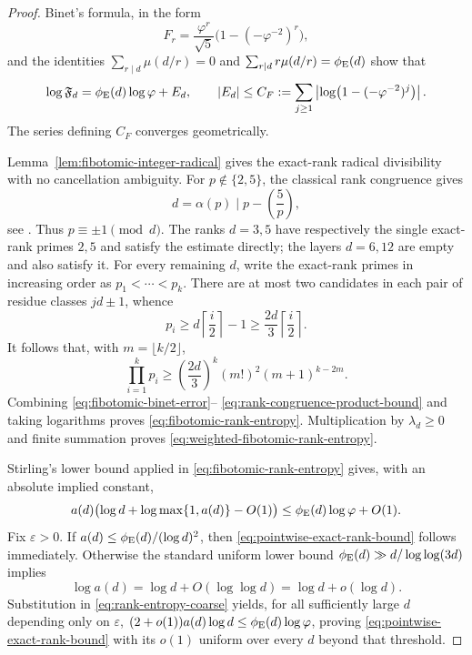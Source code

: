 \begin{proof}
Binet's formula, in the form
\[
 F_r=\frac{\varphi^r}{\sqrt5}
 \bigl(1-(-\varphi^{-2})^r\bigr),
\]
and the identities
$\sum_{r\mid d}\mu(d/r)=0$ and
$\sum_{r\mid d}r\mu(d/r)=\phi_{\rm E}(d)$ show that
\begin{equation}\label{eq:fibotomic-binet-error}
 \log\mathfrak F_d=\phi_{\rm E}(d)\log\varphi+E_d,
 \qquad
 |E_d|\leq
 C_F:=\sum_{j\geq1}
 \left|\log\bigl(1-(-\varphi^{-2})^j\bigr)\right|.
\end{equation}
The series defining $C_F$ converges geometrically.

Lemma~\ref{lem:fibotomic-integer-radical} gives the exact-rank radical
divisibility with no cancellation ambiguity.
For $p\notin\{2,5\}$, the classical rank congruence gives
\[
 d=\alpha(p)\mid p-\left(\frac5p\right),
\]
see \cite{Wall1960FibonacciModm,Vinson1963RankApparition}. Thus
$p\equiv\pm1\pmod d$. The ranks $d=3,5$ have respectively the single
exact-rank primes $2,5$ and satisfy the estimate directly; the layers
$d=6,12$ are empty and also satisfy it. For every remaining $d$, write the
exact-rank primes in increasing order as
$p_1<\cdots<p_k$. There are at most two candidates in each pair of residue
classes $jd\pm1$, whence
\[
 p_i\geq d\left\lceil\frac i2\right\rceil-1
 \geq\frac{2d}{3}\left\lceil\frac i2\right\rceil.
\]
It follows that, with $m=\lfloor k/2\rfloor$,
\begin{equation}\label{eq:rank-congruence-product-bound}
 \prod_{i=1}^kp_i\geq
 \left(\frac{2d}{3}\right)^k(m!)^2(m+1)^{k-2m}.
\end{equation}
Combining \eqref{eq:fibotomic-binet-error}--
\eqref{eq:rank-congruence-product-bound} and taking logarithms proves
\eqref{eq:fibotomic-rank-entropy}. Multiplication by $\lambda_d\geq0$ and
finite summation proves \eqref{eq:weighted-fibotomic-rank-entropy}.

Stirling's lower bound applied in \eqref{eq:fibotomic-rank-entropy} gives,
with an absolute implied constant,
\begin{equation}\label{eq:rank-entropy-coarse}
 a(d)\bigl(\log d+\log\max\{1,a(d)\}-O(1)\bigr)
 \leq \phi_{\rm E}(d)\log\varphi+O(1).
\end{equation}
Fix $\varepsilon>0$. If $a(d)\leq\phi_{\rm E}(d)/(\log d)^2$, then
\eqref{eq:pointwise-exact-rank-bound} follows immediately. Otherwise the
standard uniform lower bound
$\phi_{\rm E}(d)\gg d/\log\log(3d)$
\cite{HardyWright2008Introduction} implies
\[
 \log a(d)=\log d+O(\log\log d)=\log d+o(\log d).
\]
Substitution in \eqref{eq:rank-entropy-coarse} yields, for all sufficiently
large $d$ depending only on $\varepsilon$,
$(2+o(1))a(d)\log d\leq\phi_{\rm E}(d)\log\varphi$, proving
\eqref{eq:pointwise-exact-rank-bound} with its $o(1)$ uniform over every
$d$ beyond that threshold.


\end{proof}
